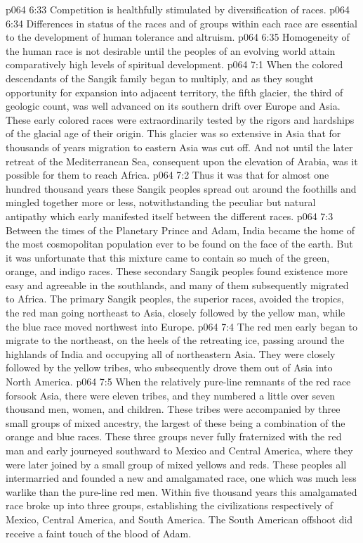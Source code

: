 \pc \vs p064 6:33 \bibnobreakspace Competition is healthfully stimulated by diversification of races.
\pc \vs p064 6:34 \bibnobreakspace Differences in status of the races and of groups within each race are essential to the development of human tolerance and altruism.
\pc \vs p064 6:35 \bibnobreakspace Homogeneity of the human race is not desirable until the peoples of an evolving world attain comparatively high levels of spiritual development.
\vs p064 7:1 When the colored descendants of the Sangik family began to multiply, and as they sought opportunity for expansion into adjacent territory, the fifth glacier, the third of geologic count, was well advanced on its southern drift over Europe and Asia. These early colored races were extraordinarily tested by the rigors and hardships of the glacial age of their origin. This glacier was so extensive in Asia that for thousands of years migration to eastern Asia was cut off. And not until the later retreat of the Mediterranean Sea, consequent upon the elevation of Arabia, was it possible for them to reach Africa.
\vs p064 7:2 Thus it was that for almost one hundred thousand years these Sangik peoples spread out around the foothills and mingled together more or less, notwithstanding the peculiar but natural antipathy which early manifested itself between the different races.
\vs p064 7:3 Between the times of the Planetary Prince and Adam, India became the home of the most cosmopolitan population ever to be found on the face of the earth. But it was unfortunate that this mixture came to contain so much of the green, orange, and indigo races. These secondary Sangik peoples found existence more easy and agreeable in the southlands, and many of them subsequently migrated to Africa. The primary Sangik peoples, the superior races, avoided the tropics, the red man going northeast to Asia, closely followed by the yellow man, while the blue race moved northwest into Europe.
\vs p064 7:4 The red men early began to migrate to the northeast, on the heels of the retreating ice, passing around the highlands of India and occupying all of northeastern Asia. They were closely followed by the yellow tribes, who subsequently drove them out of Asia into North America.
\vs p064 7:5 When the relatively pure\hyp{}line remnants of the red race forsook Asia, there were eleven tribes, and they numbered a little over seven thousand men, women, and children. These tribes were accompanied by three small groups of mixed ancestry, the largest of these being a combination of the orange and blue races. These three groups never fully fraternized with the red man and early journeyed southward to Mexico and Central America, where they were later joined by a small group of mixed yellows and reds. These peoples all intermarried and founded a new and amalgamated race, one which was much less warlike than the pure\hyp{}line red men. Within five thousand years this amalgamated race broke up into three groups, establishing the civilizations respectively of Mexico, Central America, and South America. The South American offshoot did receive a faint touch of the blood of Adam.
